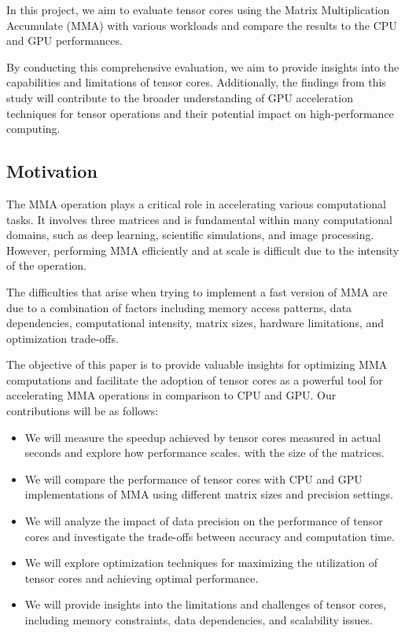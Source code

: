 \documentclass[conference]{IEEEtran}
\begin{document}
In this project, we aim to evaluate tensor cores using the Matrix Multiplication Accumulate (MMA) with various 
workloads and compare the results to the CPU and GPU performances. 

By conducting this comprehensive evaluation, we aim to provide insights into the capabilities and 
limitations of tensor cores. Additionally, the findings from this study will contribute to the 
broader understanding of GPU acceleration techniques for tensor operations and their potential 
impact on high-performance computing.

\subsection{Motivation}\label{sec:Motivation}

The MMA operation plays a critical role in accelerating various computational tasks.
It involves three matrices and is fundamental within many computational domains, 
such as deep learning, scientific simulations, and image processing. However, performing MMA 
efficiently and at scale is difficult due to the intensity of the operation. 

The difficulties that arise when trying to implement a fast version of MMA are due to 
a combination of factors including memory access patterns, data dependencies, 
computational intensity, matrix sizes, hardware limitations, and optimization trade-offs.

The objective of this paper is to provide valuable insights for optimizing MMA computations
and facilitate the adoption of tensor cores as a powerful tool for accelerating MMA 
operations in comparison to CPU and GPU. Our contributions will be as follows:
\begin{itemize}
  \item We will measure the speedup achieved by tensor cores measured in actual seconds and explore how 
  performance scales.
  with the size of the matrices.

  \item We will compare the performance of tensor cores with CPU and GPU implementations of MMA 
  using different matrix sizes and precision settings.
  
  \item We will analyze the impact of data precision on the performance of tensor cores and 
  investigate the trade-offs between accuracy and computation time.
  
  \item We will explore optimization techniques for maximizing the utilization of tensor cores 
  and achieving optimal performance.
  
  \item We will provide insights into the limitations and challenges of tensor cores, 
  including memory constraints, data dependencies, and scalability issues.
  
  \end{itemize}
  
\end{document}

